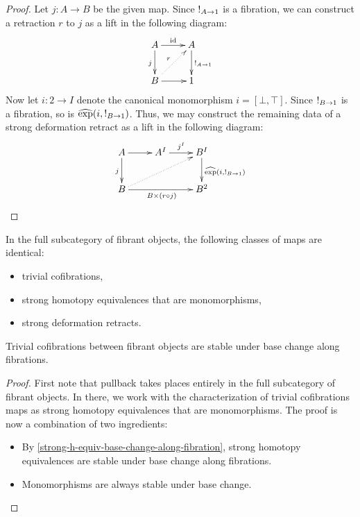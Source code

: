 \documentclass[reqno,10pt,a4paper,oneside]{amsart}
\begin{document}
\begin{proof}
Let $j : A \to B$ be the given map.
Since $\mathord{!}_{A \to 1}$ is a fibration, we can construct a retraction $r$ to $j$ as a lift in the following diagram:
\[
\xymatrix{
  A
  \ar[r]^{\id}
  \ar[d]_{j}
&
  A
  \ar[d]^{\canonical_{A \to 1}}
\\
  B
  \ar[r]
  \ar@{.>}[ur]^{r}
&
  1
}
\]
Now let $i : 2 \to I$ denote the canonical monomorphism $i = [\bot, \top]$.
Since $\mathord{!}_{B \to 1}$ is a fibration, so is $\operatorname{\widehat{exp}}(i, \mathord{!}_{B \to 1})$.
Thus, we may construct the remaining data of a strong deformation retract as a lift in the following diagram:
\[
\xymatrix{
  A
  \ar[r]
  \ar[d]_{j}
&
  A^I
  \ar[r]^{j^I}
&
  B^I
  \ar[d]^{\hatexp(i, \canonical_{B \to 1})}
\\
  B
  \ar[rr]_{B \times (r \cc j)}
  \ar@{.>}[urr]
&&
  B^2
}
\]
\end{proof}

\begin{corollary}
\label{anodyne-between-fibrant-characterization}
In the full subcategory of fibrant objects, the following classes of maps are identical:
\begin{itemize}
\item
trivial cofibrations,
\item
strong homotopy equivalences that are monomorphisms,
\item
strong deformation retracts.
\end{itemize}
\end{corollary}

\begin{lemma}
\label{fibration-base-change-of-anodyne-between-fibrant}
Trivial cofibrations between fibrant objects are stable under base change along fibrations.
\end{lemma}

\begin{proof}
First note that pullback takes places entirely in the full subcategory of fibrant objects.
In there, we work with the characterization of trivial cofibrations maps as strong homotopy equivalences that are monomorphisms.
The proof is now a combination of two ingredients:
\begin{itemize}
\item
By \cref{strong-h-equiv-base-change-along-fibration}, strong homotopy equivalences are stable under base change along fibrations.
\item
Monomorphisms are always stable under base change.
\end{itemize}
\end{proof}
\end{document}
